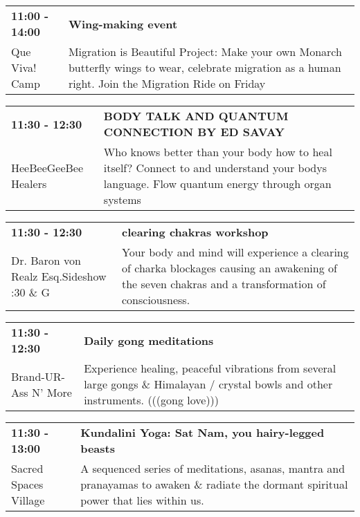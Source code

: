 \begin{tabular}{ p{1in} p{2.2in} }
    \textbf{11:00 - 14:00} & \textbf{Wing-making event} \\
    Que Viva! Camp \newline  & Migration is Beautiful Project: Make your own Monarch butterfly wings to wear, celebrate migration as a human right. Join the Migration Ride on Friday \\
    \hline 
\end{tabular}
    
\begin{tabular}{ p{1in} p{2.2in} }
    \textbf{11:30 - 12:30} & \textbf{BODY TALK AND QUANTUM CONNECTION BY ED SAVAY} \\
    HeeBeeGeeBee Healers \newline  & Who knows better than your body how to heal itself? Connect to and understand your bodys language. Flow quantum energy through organ systems \\
    \hline 
\end{tabular}
    
\begin{tabular}{ p{1in} p{2.2in} }
    \textbf{11:30 - 12:30} & \textbf{clearing chakras workshop} \\
    Dr. Baron von Realz Esq.Sideshow \newline 4:30 \& G & Your body and mind will experience a clearing of charka blockages causing an awakening of the seven chakras and a transformation of consciousness. \\
    \hline 
\end{tabular}
    
\begin{tabular}{ p{1in} p{2.2in} }
    \textbf{11:30 - 12:30} & \textbf{Daily gong meditations} \\
    Brand-UR-Ass N' More \newline  & Experience healing, peaceful vibrations from several large gongs \& Himalayan / crystal bowls and other instruments. (((gong love))) \\
    \hline 
\end{tabular}
    
\begin{tabular}{ p{1in} p{2.2in} }
    \textbf{11:30 - 13:00} & \textbf{Kundalini Yoga: Sat Nam, you hairy-legged beasts} \\
    Sacred Spaces Village \newline  & A sequenced series of meditations, asanas, mantra and pranayamas to awaken \& radiate the dormant spiritual power that lies within us. \\
    \hline 
\end{tabular}
    
